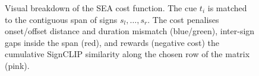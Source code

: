 \documentclass[11pt,a4paper]{article}
\begin{document}
\begin{figure}[h]
\caption{Visual breakdown of the SEA cost function. The cue $t_i$ is matched
to the contiguous span of signs $s_l,\dots,s_r$. The cost penalises onset/offset
distance and duration mismatch (blue/green), inter-sign gaps inside the span
(red), and rewards (negative cost) the cumulative SignCLIP similarity along
the chosen row of the matrix (pink).}
\label{fig:cost-function}
\end{figure}
\end{document}

